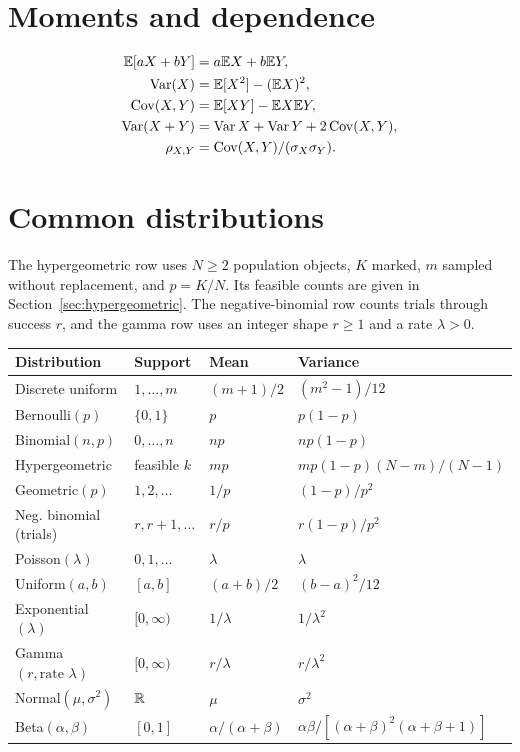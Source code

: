 \section*{Moments and dependence}
\begin{align*}
\mathbb E[aX+bY]&=a\mathbb E X+b\mathbb E Y,\\
\operatorname{Var}(X)&=\mathbb E[X^2]-(\mathbb E X)^2,\\
\operatorname{Cov}(X,Y)&=\mathbb E[XY]-\mathbb E X\mathbb E Y,\\
\operatorname{Var}(X+Y)&=\operatorname{Var} X+\operatorname{Var} Y+2\operatorname{Cov}(X,Y),\\
\rho_{X,Y}&=\operatorname{Cov}(X,Y)/(\sigma_X\sigma_Y).
\end{align*}

\section*{Common distributions}
The hypergeometric row uses $N\ge2$ population objects, $K$ marked,
$m$ sampled without replacement, and $p=K/N$.
Its feasible counts are given in Section~\ref{sec:hypergeometric}.
The negative-binomial row counts trials through success $r$, and the
gamma row uses an integer shape $r\ge1$ and a rate $\lambda>0$.
\begin{center}\small
\begin{tabular}{llll}
\toprule
Distribution & Support & Mean & Variance \\
\midrule
Discrete uniform & $1,\ldots,m$ & $(m+1)/2$ & $(m^2-1)/12$ \\
Bernoulli$(p)$ & $\{0,1\}$ & $p$ & $p(1-p)$ \\
Binomial$(n,p)$ & $0,\ldots,n$ & $np$ & $np(1-p)$ \\
Hypergeometric & feasible $k$ & $mp$ & $mp(1-p)(N-m)/(N-1)$ \\
Geometric$(p)$ & $1,2,\ldots$ & $1/p$ & $(1-p)/p^2$ \\
Neg. binomial (trials) & $r,r+1,\ldots$ & $r/p$ & $r(1-p)/p^2$ \\
Poisson$(\lambda)$ & $0,1,\ldots$ & $\lambda$ & $\lambda$ \\
Uniform$(a,b)$ & $[a,b]$ & $(a+b)/2$ & $(b-a)^2/12$ \\
Exponential$(\lambda)$ & $[0,\infty)$ & $1/\lambda$ & $1/\lambda^2$ \\
Gamma$(r,\text{rate }\lambda)$ & $[0,\infty)$ & $r/\lambda$ & $r/\lambda^2$ \\
Normal$(\mu,\sigma^2)$ & $\mathbb R$ & $\mu$ & $\sigma^2$ \\
Beta$(\alpha,\beta)$ & $[0,1]$ & $\alpha/(\alpha+\beta)$ & $\alpha\beta/[(\alpha+\beta)^2(\alpha+\beta+1)]$ \\
\bottomrule
\end{tabular}
\end{center}

